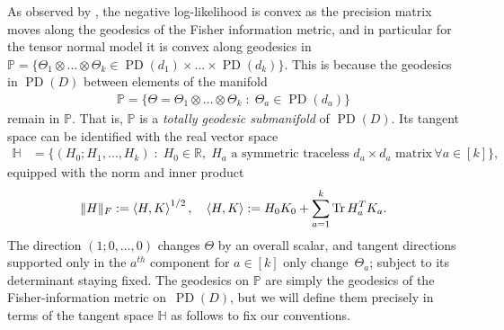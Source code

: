 \documentclass[aos]{imsart}
\theoremstyle{definition}
\numberwithin{equation}{section}
\DeclareMathOperator{\tr}{Tr}
\DeclareMathOperator{\PD}{PD}
\DeclarePairedDelimiter{\norm}{\lVert}{\rVert}
\newcommand{\R}{{\mathbb{R}}}
\renewcommand{\P}{{\mathbb{P}}}
\renewcommand{\H}{{\mathbb{H}}}
\newcommand{\ot}{\otimes}
\begin{document}
As observed by \cite{wiesel2012geodesic}, the negative log-likelihood is convex as the precision matrix moves along the geodesics of the Fisher information metric, and in particular for the tensor normal model it is convex along geodesics in $\P = \{ \Theta_1 \ot \dots \ot \Theta_k \in \PD(d_1) \times \dots \times \PD(d_k) \}$.
This is because the geodesics in $\PD(D)$ between elements of the manifold
\begin{align*}
  \P = \bigl\{ \Theta = \Theta_1 \ot \dots \ot \Theta_k \;:\; \Theta_a \in \PD(d_a) \bigr\}
\end{align*}
remain in $\P$.
That is, $\P$ is a \emph{totally geodesic submanifold} of $\PD(D)$.
Its tangent space can be identified with the real vector space
\begin{align*}
  \H &= \bigl\{ (H_0; H_1,\dots,H_k) \;:\; H_0 \in \R, \; H_a \text{ a symmetric traceless $d_a \times d_a$ matrix} \, \forall a \in [k] \bigr\},
\end{align*}
equipped with the norm and inner product
\begin{align*}
  \norm{H}_F := \braket{H, K}^{1/2}, \quad
  \braket{H,K} := H_0 K_0 + \sum_{a=1}^k \tr H_a^T K_a.
\end{align*}
The direction $(1; 0, \dots, 0)$ changes $\Theta$ by an overall scalar, and tangent directions supported only in the $a^{th}$ component for $a \in [k]$ only change~$\Theta_a$; subject to its determinant staying fixed.
The geodesics on $\P$ are simply the geodesics of the Fisher-information metric on~$\PD(D)$, but we will define them precisely in terms of the tangent space $\H$ as follows to fix our conventions.
\end{document}
